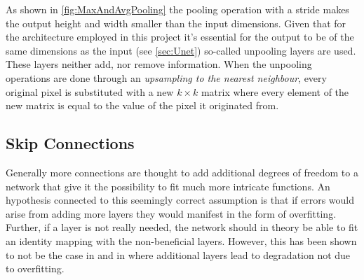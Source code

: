 As shown in \cref{fig:MaxAndAvgPooling} the pooling operation with a stride makes the output height and width smaller than the input dimensions. Given that for the architecture employed in this project it's essential for the output to be of the same dimensions as the input (see \cref{sec:Unet}) so-called unpooling layers are used. These layers neither add, nor remove information. When the unpooling operations are done through an \textit{upsampling to the nearest neighbour}, every original pixel is substituted with a new $k\times k$ matrix where every element of the new matrix is equal to the value of the pixel it originated from. 

\subsection{Skip Connections} \label{sec:skip_connections}
Generally more connections are thought to add additional degrees of freedom to a network that give it the possibility to fit much more intricate functions. An hypothesis connected to this seemingly correct assumption is that if errors would arise from adding more layers they would manifest in the form of overfitting. Further, if a layer is not really needed, the network should in theory be able to fit an identity mapping with the non-beneficial layers. However, this has been shown to not be the case in \citet{He2015ConvolutionalCost} and in \citet{Srivastava2015HighwayNetworks} where additional layers lead to degradation not due to overfitting.

